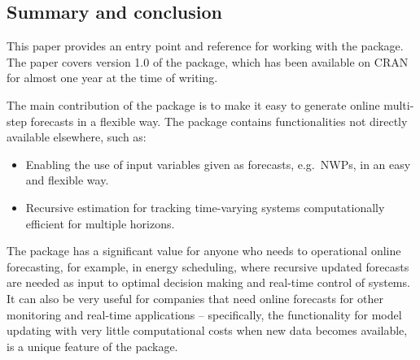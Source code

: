 \subsection{Summary and conclusion}

This paper provides an entry point and reference for working with the
\onlineforecast package. The paper covers version 1.0 of the package, which has
been available on CRAN for almost one year at the time of writing.

The main contribution of the package is to make it easy to generate online
multi-step forecasts in a flexible way. The package contains functionalities not
directly available elsewhere, such as:
\begin{itemize}
\item Enabling the use of input variables given as forecasts, e.g.\ NWPs, in an
  easy and flexible way.
\item Recursive estimation for tracking time-varying systems computationally
  efficient for multiple horizons.
\end{itemize}

The \onlineforecast package has a significant value for anyone who needs to
 operational online forecasting, for example, in
energy scheduling, where recursive updated forecasts are needed as input to
optimal decision making and real-time control of systems. It can also be very
useful for companies that need online forecasts for other monitoring and
real-time applications -- specifically, the functionality for model updating with
very little computational costs when new data becomes available, is a unique
feature of the package.




